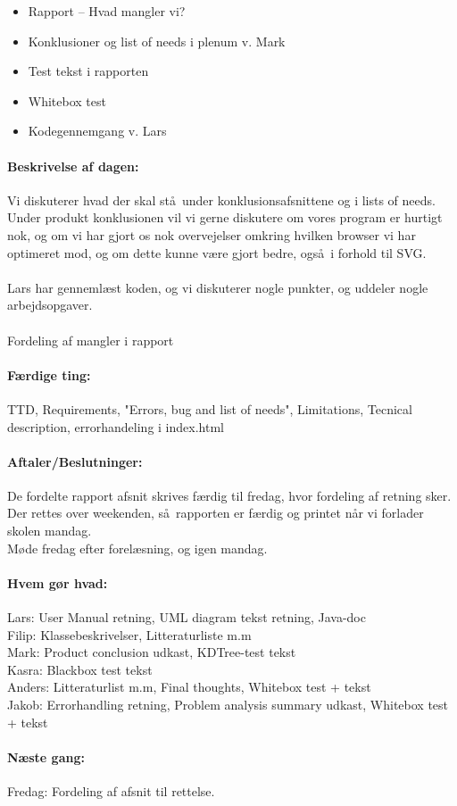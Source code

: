 \documentclass[a4paper,10pt,titlepage]{article}
\begin{document}
		\begin{itemize}
					\item Rapport – Hvad mangler vi?
					\item Konklusioner og list of needs i plenum v. Mark
					\item Test tekst i rapporten
					\item Whitebox test
					\item Kodegennemgang v. Lars
		\end{itemize}
		
		\paragraph{Beskrivelse af dagen:}
		Vi diskuterer hvad der skal st\aa \ under konklusionsafsnittene og i lists of needs.
		Under produkt konklusionen vil vi gerne diskutere om vores program er hurtigt nok,
		og om vi har gjort os nok overvejelser omkring hvilken browser vi har optimeret mod,
		og om dette kunne v\ae re gjort bedre, ogs\aa \ i forhold til SVG.\\
		\\

		Lars har genneml\ae st koden, og vi diskuterer nogle punkter, og uddeler nogle arbejdsopgaver.\\
		\\
		
		Fordeling af mangler i rapport\\

		\paragraph{F\ae rdige ting:}
		TTD, Requirements, "Errors, bug and list of needs", Limitations, 
		Tecnical description, errorhandeling i index.html\\
		
		\paragraph{Aftaler/Beslutninger:}
		De fordelte rapport afsnit skrives f\ae rdig til fredag, hvor fordeling af retning sker.\\
		Der rettes over weekenden, s\aa \ rapporten er f\ae rdig og printet n\aa r vi forlader skolen mandag.\\
		M\o de fredag efter forel\ae sning, og igen mandag.\\
		
		\paragraph{Hvem g\o r hvad:}
		Lars: User Manual retning, UML diagram tekst retning, Java-doc\\
		Filip: Klassebeskrivelser, Litteraturliste m.m\\
		Mark: Product conclusion udkast, KDTree-test tekst\\
		Kasra: Blackbox test tekst\\
		Anders: Litteraturlist m.m, Final thoughts, Whitebox test + tekst\\
		Jakob: Errorhandling retning, Problem analysis summary udkast, Whitebox test + tekst\\
		
		\paragraph{N\ae ste gang:}
		Fredag: Fordeling af afsnit til rettelse.\\ 
\end{document}
